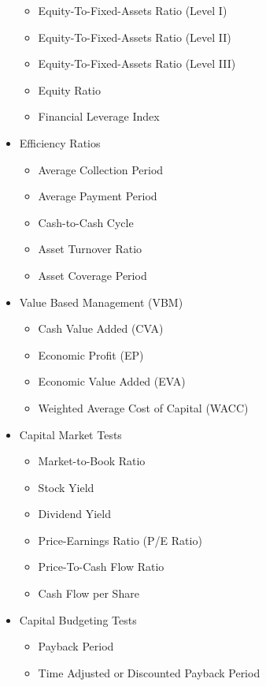\documentclass[]{book}
\providecommand{\tightlist}{%
  \setlength{\itemsep}{0pt}\setlength{\parskip}{0pt}}
\begin{document}
\begin{itemize}
  \begin{itemize}
  \tightlist
  \item
    Equity-To-Fixed-Assets Ratio (Level I)
  \item
    Equity-To-Fixed-Assets Ratio (Level II)
  \item
    Equity-To-Fixed-Assets Ratio (Level III)
  \item
    Equity Ratio\\
  \item
    Financial Leverage Index
  \end{itemize}
\item
  Efficiency Ratios

  \begin{itemize}
  \tightlist
  \item
    Average Collection Period
  \item
    Average Payment Period\\
  \item
    Cash-to-Cash Cycle\\
  \item
    Asset Turnover Ratio
  \item
    Asset Coverage Period
  \end{itemize}
\item
  Value Based Management (VBM)

  \begin{itemize}
  \tightlist
  \item
    Cash Value Added (CVA)\\
  \item
    Economic Profit (EP)\\
  \item
    Economic Value Added (EVA)\\
  \item
    Weighted Average Cost of Capital (WACC)
  \end{itemize}
\item
  Capital Market Tests

  \begin{itemize}
  \tightlist
  \item
    Market-to-Book Ratio\\
  \item
    Stock Yield\\
  \item
    Dividend Yield
  \item
    Price-Earnings Ratio (P/E Ratio)
  \item
    Price-To-Cash Flow Ratio
  \item
    Cash Flow per Share
  \end{itemize}
\item
  Capital Budgeting Tests

  \begin{itemize}
  \tightlist
  \item
    Payback Period
  \item
    Time Adjusted or Discounted Payback Period
  \end{itemize}
\end{itemize}
\end{document}
